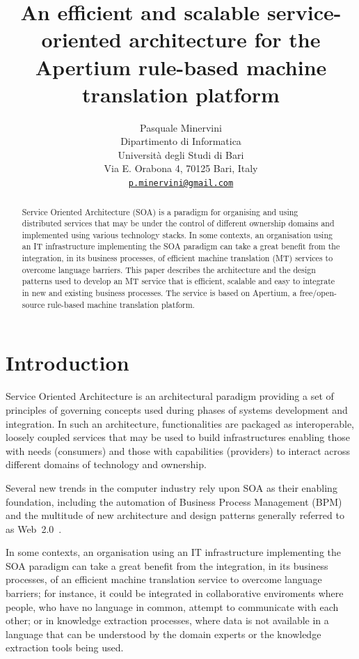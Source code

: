 \documentclass[11pt]{article}
\title{An efficient and scalable service-oriented architecture for the Apertium rule-based machine translation platform}
\author{Pasquale Minervini\\
  Dipartimento di Informatica\\
  Università degli Studi di Bari\\
  Via E. Orabona 4, 70125 Bari, Italy\\
  \href{mailto:p.minervini@gmail.com}{\nolinkurl{p.minervini@gmail.com}}}
\date{}
\begin{document}
\maketitle

\begin{abstract}
Service Oriented Architecture (SOA) is a paradigm for organising and using distributed services that may be under the control of different ownership domains and implemented using various technology stacks. In some contexts, an organisation using an IT infrastructure implementing the SOA paradigm can take a great benefit from the integration, in its business processes, of efficient machine translation (MT) services to overcome language barriers. This paper describes the architecture and the design patterns used to develop an MT service that is efficient, scalable and easy to integrate in new and existing business processes. The service is based on Apertium, a free/open-source rule-based machine translation platform.
\end{abstract}

\section{Introduction}

Service Oriented Architecture is an architectural paradigm providing a set of principles of governing concepts used during phases of systems development and integration. In such an architecture, functionalities are packaged as interoperable, loosely coupled services that may be used to build infrastructures enabling those with needs (consumers) and those with capabilities (providers) to interact across different domains of technology and ownership.

Several new trends in the computer industry rely upon SOA as their enabling foundation, including the automation of Business Process Management (BPM) and the multitude of new architecture and design patterns generally referred to as Web~2.0~\citep{web20}.

In some contexts, an organisation using an IT infrastructure implementing the SOA paradigm can take a great benefit from the integration, in its business processes, of an efficient machine translation service to overcome language barriers; for instance, it could be integrated in collaborative enviroments where people, who have no language in common, attempt to communicate with each other; or in knowledge extraction processes, where data is not available in a language that can be understood by the domain experts or the knowledge extraction tools being used.
\end{document}
